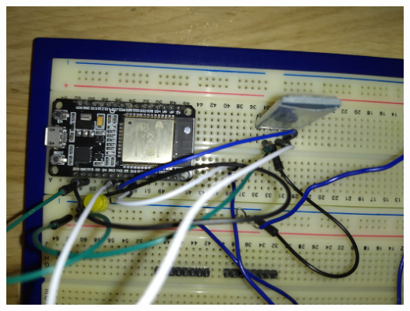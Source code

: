\documentclass[eng,printmode]{mgr}
\begin{document}
\begin{center}
\includegraphics[width=\textwidth]{odbiornik-2}
\end{center}


\end{document}
